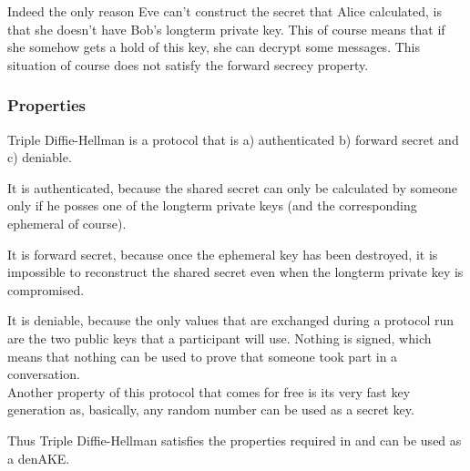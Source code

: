 \documentclass[12pt,titlepage,a4paper]{article}
\begin{document}
{Indeed the only reason Eve can't construct the secret that Alice calculated, is
that she doesn't have Bob's longterm private key. This of course means that if
she somehow gets a hold of this key, she can decrypt some messages. This situation
of course does not satisfy the forward secrecy property.


\subsubsection{Properties}

Triple Diffie-Hellman is a protocol that is a) authenticated b) forward secret
and c) deniable.

It is authenticated, because the shared secret can only be calculated by someone
only if he posses one of the longterm private keys (and the corresponding ephemeral
of course).

It is forward secret, because once the ephemeral key has been destroyed, it is
impossible to reconstruct the shared secret even when the longterm
private key is compromised.

It is deniable, because the only values that are exchanged during a protocol run
are the two public keys that a participant will use. Nothing is signed, which means
that nothing can be used to prove that someone took part in a conversation.\\[0.5cm]

Another property of this protocol that comes for free is its very fast key generation
as, basically, any random number can be used as a secret key.

Thus Triple Diffie-Hellman satisfies the properties required in \cite{mpotr} and
can be used as a denAKE.

}
\end{document}
